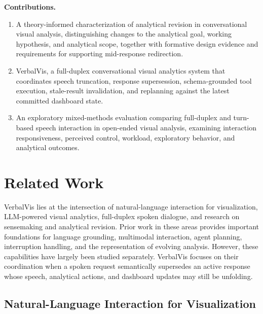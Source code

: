 \documentclass[journal]{IEEEtran}
\begin{document}
\textbf{Contributions.}
\begin{enumerate}
\setlength{\itemsep}{0pt}
\setlength{\parskip}{0pt}

\item A theory-informed characterization of analytical revision in
conversational visual analysis, distinguishing changes to the analytical
goal, working hypothesis, and analytical scope, together with formative
design evidence and requirements for supporting mid-response redirection.

\item VerbalVis, a full-duplex conversational visual analytics system that
coordinates speech truncation, response supersession, schema-grounded tool
execution, stale-result invalidation, and replanning against the latest
committed dashboard state.

\item An exploratory mixed-methods evaluation comparing full-duplex and
turn-based speech interaction in open-ended visual analysis, examining
interaction responsiveness, perceived control, workload, exploratory
behavior, and analytical outcomes.

\end{enumerate}





\section{Related Work}
\label{sec:related}

VerbalVis lies at the intersection of natural-language interaction for
visualization, LLM-powered visual analytics, full-duplex spoken dialogue, and
research on sensemaking and analytical revision. Prior work in these areas
provides important foundations for language grounding, multimodal interaction,
agent planning, interruption handling, and the representation of evolving
analysis. However, these capabilities have largely been studied separately.
VerbalVis focuses on their coordination when a spoken request semantically
supersedes an active response whose speech, analytical actions, and dashboard
updates may still be unfolding.

\subsection{Natural-Language Interaction for Visualization}
\label{sec:rw-nli}
\end{document}
